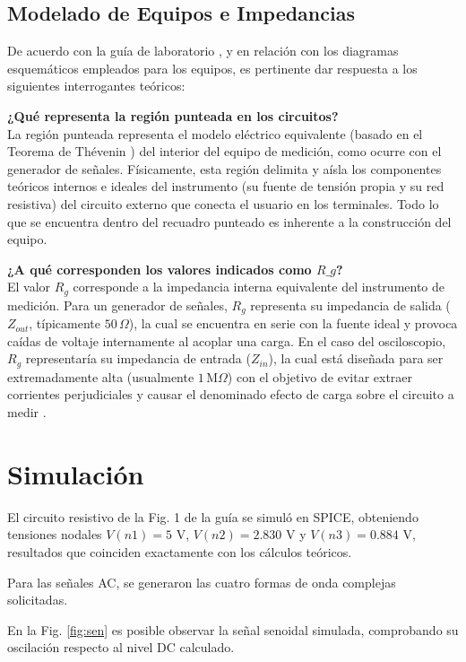\documentclass[journal, a4paper]{IEEEtran}
\begin{document}
\subsection{Modelado de Equipos e Impedancias}
De acuerdo con la guía de laboratorio \cite{guia_practica0}, y en relación con los diagramas esquemáticos empleados para los equipos, es pertinente dar respuesta a los siguientes interrogantes teóricos:

\textbf{¿Qué representa la región punteada en los circuitos?} \\
La región punteada representa el modelo eléctrico equivalente (basado en el Teorema de Thévenin \cite{sedra2020}) del interior del equipo de medición, como ocurre con el generador de señales. Físicamente, esta región delimita y aísla los componentes teóricos internos e ideales del instrumento (su fuente de tensión propia y su red resistiva) del circuito externo que conecta el usuario en los terminales. Todo lo que se encuentra dentro del recuadro punteado es inherente a la construcción del equipo.

\textbf{¿A qué corresponden los valores indicados como $R\_g$?} \\
El valor $R_g$ corresponde a la impedancia interna equivalente del instrumento de medición. Para un generador de señales, $R_g$ representa su impedancia de salida ($Z_{out}$, típicamente $50\,\Omega$), la cual se encuentra en serie con la fuente ideal y provoca caídas de voltaje internamente al acoplar una carga. En el caso del osciloscopio, $R_g$ representaría su impedancia de entrada ($Z_{in}$), la cual está diseñada para ser extremadamente alta (usualmente $1\,\text{M}\Omega$) con el objetivo de evitar extraer corrientes perjudiciales y causar el denominado efecto de carga sobre el circuito a medir \cite{sedra2020, buadlab_impedance}.

\section{Simulación}
El circuito resistivo de la Fig. 1 de la guía \cite{guia_practica0} se simuló en SPICE, obteniendo tensiones nodales $V(n1)=5\text{ V}$, $V(n2)=2.830\text{ V}$ y $V(n3)=0.884\text{ V}$, resultados que coinciden exactamente con los cálculos teóricos.

Para las señales AC, se generaron las cuatro formas de onda complejas solicitadas.

En la Fig. \ref{fig:sen} es posible observar la señal senoidal simulada, comprobando su oscilación respecto al nivel DC calculado.
\end{document}
